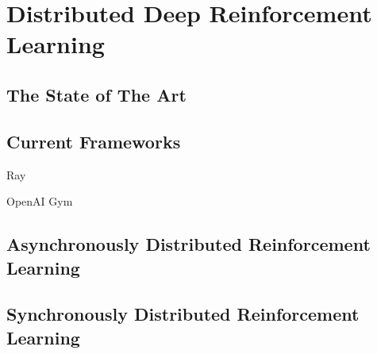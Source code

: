 
\chapter{Distributed Deep Reinforcement Learning}\label{chapter:Distributed Deep Reinforcement Learning}


\section{The State of The Art}

\section{Current Frameworks}

Ray ~\parencite{DBLP:journals/corr/abs-1712-05889}

OpenAI Gym ~\parencite{brockman2016openai}

\section{Asynchronously Distributed Reinforcement Learning}

\section{Synchronously Distributed Reinforcement Learning}